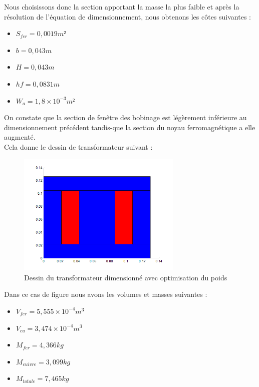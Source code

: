 Nous choisissons donc la section apportant la masse la plus faible et après la résolution de l'équation de dimensionnement, nous obtenons les côtes suivantes : \\
\begin{itemize}
\item $S_{fer} = 0,0019 m² $
\item $b = 0,043 m $
\item $H = 0,043 m $
\item $hf = 0,0831 m $
\item $W_a = 1,8\times{}10^{-3} m² $
\end{itemize}

On constate que la section de fenêtre des bobinage est légèrement inférieure au dimensionnement précédent tandis-que la section du noyau ferromagnétique a elle augmenté.\\

Cela donne le dessin de transformateur suivant :\\
\begin{figure}
	\begin{center}
	\includegraphics[width=0.7\textwidth]{images/TP1_transfo_poids}
	\caption{Dessin du transformateur dimensionné avec optimisation du poids}\label{img:dessinTransfoPoids}
	\end{center}
\end{figure}
\FloatBarrier 

Dans ce cas de figure nous avons les volumes et masses suivantes : \\
\begin{itemize}
\item $V_{fer} = 5,555 \times{}10^{-4} m^3$
\item $V_{cu} = 3,474 \times{}10^{-4} m^3$
\item $M_{fer} = 4,366 kg$
\item $M_{cuivre} = 3,099 kg $
\item $M_{totale} = 7,465 kg $
\end{itemize}

